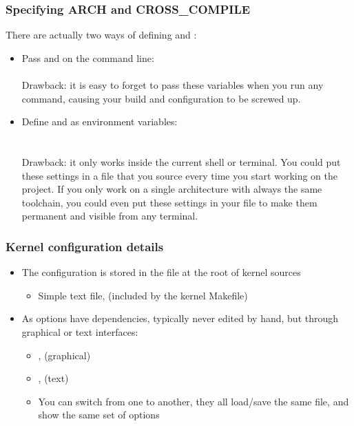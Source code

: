 \begin{frame}
  \frametitle{Specifying ARCH and CROSS\_COMPILE}
  There are actually two ways of defining  and :
  \begin{itemize}
  \item Pass  and  on the 
    command line: \\
     \\
    Drawback: it is easy to forget to pass these variables when
    you run any  command, causing your build and
    configuration to be screwed up.
  \item Define  and  as environment
    variables: \\
     \\
     \\
    Drawback: it only works inside the current
    shell or terminal. You could put these settings in a file
    that you source every time you start working on the project.
    If you only work on a single architecture with always the
    same toolchain, you could even put these settings in your
     file to make them permanent and visible from
    any terminal.
  \end{itemize}
\end{frame}

\begin{frame}
  \frametitle{Kernel configuration details}
  \begin{itemize}
  \item The configuration is stored in the  file at the
    root of kernel sources
    \begin{itemize}
    \item Simple text file,  (included by the kernel Makefile)
    \end{itemize}
  \item As options have dependencies, typically never edited by hand,
    but through graphical or text interfaces:
    \begin{itemize}
    \item {},  (graphical)
    \item {},  (text)
    \item You can switch from one to another, they all load/save the
      same  file, and show the same set of options
    \end{itemize}
  \end{itemize}
\end{frame}

